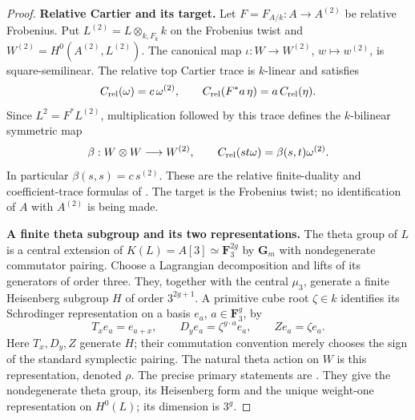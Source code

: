 \begin{proof}
\par\smallskip\noindent\textbf{Relative Cartier and its target.}
Let $F=F_{A/k}:A\to A^{(2)}$ be relative Frobenius. Put
$L^{(2)}=L\otimes_{k,F_k}k$ on the Frobenius twist and
$W^{(2)}=H^0(A^{(2)},L^{(2)})$. The canonical map
$\iota:W\to W^{(2)}$, $w\mapsto w^{(2)}$, is square-semilinear.
The relative top Cartier trace is $k$-linear and satisfies
\[
 C_{\rm rel}(\omega)=c\,\omega^{(2)},\qquad
 C_{\rm rel}(F^*a\,\eta)=a\,C_{\rm rel}(\eta).
\]
Since $L^2=F^*L^{(2)}$, multiplication followed by this trace defines
the $k$-bilinear symmetric map
\begin{equation}\label{eq:ppav-relative-beta}
 \beta:W\otimes W\longrightarrow W^{(2)},\qquad
 C_{\rm rel}(s t\omega)=\beta(s,t)\omega^{(2)}.
\end{equation}
In particular $\beta(s,s)=c\,s^{(2)}$.
These are the relative finite-duality and coefficient-trace formulas
of \cite[Lemma~1.3.6, Proposition~1.3.7, Theorem~1.3.8, pp.~26--28]
{BrionKumar2005}. The target is the Frobenius twist; no identification
of $A$ with $A^{(2)}$ is being made.

\par\smallskip\noindent\textbf{A finite theta subgroup and its two representations.}
The theta group of $L$ is a central extension of
$K(L)=A[3]\simeq\mathbf F_3^{2g}$ by $\mathbf G_m$ with nondegenerate
commutator pairing. Choose a Lagrangian decomposition and lifts of
its generators of order three. They, together with the central
$\mu_3$, generate a finite Heisenberg subgroup $H$ of order
$3^{2g+1}$. A primitive cube root $\zeta\in k$ identifies its
Schrodinger representation on a basis $e_a$, $a\in\mathbf F_3^g$, by
\[
 T_x e_a=e_{a+x},\qquad D_y e_a=\zeta^{y\cdot a}e_a,
 \qquad Z e_a=\zeta e_a.
\]
Here $T_x,D_y,Z$ generate $H$; their commutation convention merely
chooses the sign of the standard symplectic pairing.
The natural theta action on $W$ is this representation, denoted
$\rho$. The precise primary statements are
\cite[Corollary~8.20, Lemma~8.24, Theorem~8.28, description~8.29,
pp.~119, 121--123; Corollary~9.17, pp.~133--134]
{EdixhovenVanDerGeerMoonenAV}. They give the nondegenerate theta
group, its Heisenberg form and the unique weight-one representation
on $H^0(L)$; its dimension is $3^g$.


\end{proof}
